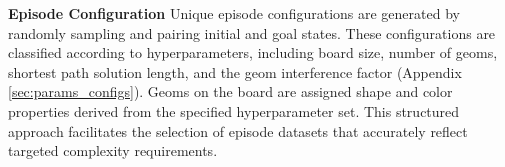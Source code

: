 \textbf{Episode Configuration}\hspace{.3cm}  Unique episode configurations are generated by randomly sampling and pairing initial and goal states. These configurations are classified according to hyperparameters, including board size, number of geoms, shortest path solution length, and the geom interference factor (Appendix \ref{sec:params_configs}). Geoms on the board are assigned shape and color properties derived from the specified hyperparameter set. This structured approach facilitates the selection of episode datasets that accurately reflect targeted complexity requirements.